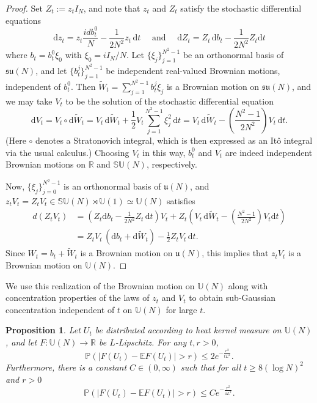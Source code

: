 \documentclass[11pt]{article}
\newtheorem{prop}[theo]{Proposition}
\theoremstyle{definition}
\numberwithin{equation}{section}
\numberwithin{figure}{section}
\numberwithin{table}{section}
\newcommand{\Unitary}[1]{\mathbb{U}\left(#1\right)}
\newcommand{\SUnitary}[1]{\mathbb{SU}\left(#1\right)}
\newcommand{\R}{\mathbb{R}}
\newcommand{\E}{\mathbb{E}}
\newcommand{\Prob}{\mathbb{P}}
\newcommand*{\dd}{\mathrm{d}}
\newcommand*{\dt}{\dd t}
\newcommand*{\dz}{\dd z}
\newcommand*{\db}{\dd b}
\newcommand*{\dZ}{\dd Z}
\newcommand*{\dV}{\dd V}
\newcommand*{\dtW}{\dd \tilde{W}}
\renewcommand{\tilde}{\widetilde}
\begin{document}
\begin{proof}
Set $Z_t:=z_tI_N$, and note that $z_t$ and $Z_t$ satisfy the stochastic differential equations
\[
\dz_t = z_t \frac{idb_t^0}{N} - \frac{1}{2N^2}z_t\,\dt
\quad \text{ and } \quad \dZ_t = Z_t\,\db_t - \frac{1}{2N^2}Z_t \dt
\]
where $b_t =b_t^0\xi_0$ with $\xi_0=iI_N/N$. Let $\{\xi_j\}_{j=1}^{N^2-1}$ be an orthonormal basis of $\mathfrak{su}(N)$, and let $\{b_t^j\}_{j=1}^{N^2-1}$ be independent real-valued Brownian motions, independent of $b^0_t$. Then $\tilde{W}_t= \sum_{j=1}^{N^2-1} b_t^j \xi_j$ is a Brownian motion on $\mathfrak{su}(N)$, and we may take $V_t$ to be the solution of the stochastic differential equation
\[
\dV_t = V_t\circ \dtW_t = V_t\,\dtW_t + \frac{1}{2}V_t\sum_{j=1}^{N^2-1} \xi_j^2 \,\dt = V_t\,\dtW_t - \left(\frac{N^2-1}{2N^2}\right)V_t\, \dt.
\]
(Here $\circ$ denotes a Stratonovich integral, which is then expressed as an It\^o integral via the usual calculus.) Choosing $V_t$ in this way, $b^0_t$ and $V_t$ are indeed independent Brownian motions on $\R$ and $\SUnitary{N}$, respectively.

Now, $\{\xi_j\}_{j=0}^{N^2-1}$ is an orthonormal basis of $\mathfrak{u}(N)$, and $z_tV_t=Z_tV_t\in \SUnitary{N}\rtimes \mathbb{U}(1)\simeq \mathbb{U}(N)$ satisfies
\begin{align*}
d(Z_tV_t) &= \left(Z_t \db_t - \frac{1}{2N^2} Z_t\,\dt\right)V_t + Z_t\left(V_t\,\dtW_t - \left(\frac{N^2-1}{2N^2}\right)V_t\dt\right)
\\
&= Z_tV_t\,(\db_t +\dtW_t) - \frac{1}{2}Z_tV_t\,\dt.
\end{align*}
Since $W_t=b_t+\tilde{W}_t$ is a Brownian motion on $\mathfrak{u}(N)$, this implies that $z_tV_t$ is a Brownian motion on $\mathbb{U}(N)$.
\end{proof}

We use this realization of the Brownian motion on $\mathbb{U}(N)$ along with concentration properties of the laws of $z_t$ and $V_t$ to obtain sub-Gaussian concentration independent of $t$ on $\Unitary{N}$ for large $t$.

\begin{prop}\label{T:BM-U(N)-concentration}
Let $U_t$ be distributed according to heat kernel measure on $\Unitary{N}$, and let $F:\Unitary{N}\to\R$ be $L$-Lipschitz. For any $t,r>0$,
\[
\Prob(|F(U_t)-\E F(U_t)|>r)\le 2e^{-\frac{r^2}{tL^2}}.
\]
Furthermore, there is a constant $C\in(0,\infty)$ such that for all $t\ge8(\log N)^2$ and $r>0$
\[
\Prob\left(|F(U_t)-\E F(U_t)|>r\right)\le C e^{-\frac{r^2}{4L^2}}.
\]
\end{prop}
\end{document}
